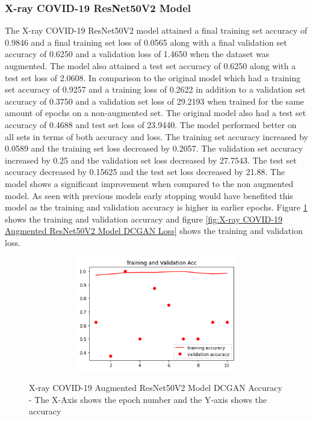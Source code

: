\subsubsection{X-ray COVID-19 ResNet50V2 Model}
The X-ray COVID-19 ResNet50V2 model attained a final training set accuracy of 0.9846 and a final training set loss of 0.0565 along with a final validation set accuracy of 0.6250 and a validation loss of 1.4650 when the dataset was augmented.  The model also attained a test set accuracy of 0.6250 along with a test set loss of 2.0608.  In comparison to the original model which had a training set accuracy of 0.9257 and a training loss of 0.2622 in addition to a validation set accuracy of 0.3750 and a validation set loss of 29.2193 when trained for the same amount of epochs on a non-augmented set.  The original model also had a test set accuracy of 0.4688 and test set loss of 23.9440.  The model performed better on all sets in terms of both accuracy and loss.  The training set accuracy increased by 0.0589 and the training set loss decreased by 0.2057. The validation set accuracy increased by 0.25 and the validation set loss decreased by 27.7543.  The test set accuracy decreased by 0.15625 and the test set loss decreased by 21.88.  The model shows a significant improvement when compared to the non augmented model. As seen with previous models early stopping would have benefited this model as the training and validation accuracy is higher in earlier epochs.  Figure \ref{fig:X-ray COVID-19 Augmented ResNet50V2 Model DCGAN Accuracy} shows the training and validation accuracy and figure \ref{fig:X-ray COVID-19 Augmented ResNet50V2 Model DCGAN Loss} shows the training and validation loss.
 \begin{figure}[H]
    \centering    \includegraphics[width=1\textwidth,height=5cm,keepaspectratio]{Images/ResNet50V2BaselineTrainingValidationAccXRayCOVID19AugmentedDCGAN.png}\\
    \caption{X-ray COVID-19 Augmented ResNet50V2 Model DCGAN Accuracy - The X-Axis shows the epoch number and the Y-axis shows the accuracy}
    \label{fig:X-ray COVID-19 Augmented ResNet50V2 Model DCGAN Accuracy}
\end{figure}
